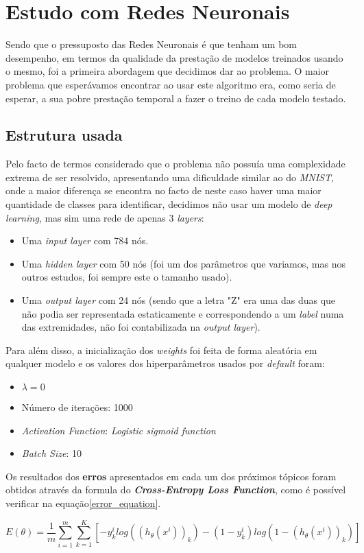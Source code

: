 \section{Estudo com Redes Neuronais}
Sendo que o pressuposto das Redes Neuronais é que tenham um bom desempenho, em termos da qualidade da prestação de modelos treinados usando o mesmo, foi a primeira abordagem que decidimos dar ao problema. O maior problema que esperávamos encontrar ao usar este algoritmo era, como seria de esperar, a sua pobre prestação temporal a fazer o treino de cada modelo testado.

\subsection{Estrutura usada}
Pelo facto de termos considerado que o problema não possuía uma complexidade extrema de ser resolvido, apresentando uma dificuldade similar ao do \textit{MNIST}, onde a maior diferença se encontra no facto de neste caso haver uma maior quantidade de classes para identificar, decidimos não usar um modelo de \textit{deep learning}, mas sim uma rede de apenas 3 \textit{layers}:
\begin{itemize}
\item Uma \textit{input layer} com 784 nós.
\item Uma \textit{hidden layer} com 50 nós (foi um dos parâmetros que variamos, mas nos outros estudos, foi sempre este o tamanho usado).
\item Uma \textit{output layer} com 24 nós (sendo que a letra "Z" era uma das duas que não podia ser representada estaticamente e correspondendo a um \textit{label} numa das extremidades, não foi contabilizada na \textit{output layer}).
\end{itemize}
Para além disso, a inicialização dos \textit{weights} foi feita de forma aleatória em qualquer modelo e os valores dos hiperparâmetros usados por \textit{default} foram:
\begin{itemize}
\item $\lambda = 0$
\item Número de iterações: 1000
\item \textit{Activation Function}: \textit{Logistic sigmoid function}
\item \textit{Batch Size}: 10
\end{itemize}
Os resultados dos \textbf{erros} apresentados em cada um dos próximos tópicos foram obtidos através da formula do \textbf{\textit{Cross-Entropy Loss Function}}, como é possível verificar na equação\ref{error_equation}.
\begin{figure*}[!t]
   \begin{equation}
		E(\theta) = \frac{1}{m}\sum_{i=1}^{m} \sum_{k=1}^{K} [-y_{k}^{i} log((h_{\theta}(x^{i}))_{k}) - (1 - y_{k}^{i}) log(1 - (h_{\theta}(x^{i}))_{k})]
        \label{error_equation}
	\end{equation}
\end{figure*}


